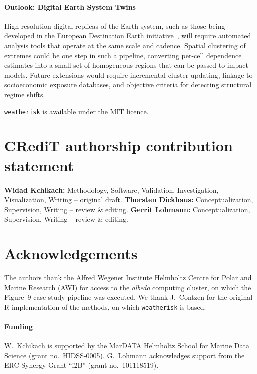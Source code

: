 \documentclass[preprint,12pt,a4paper]{elsarticle}
\newcommand{\revg}[1]{{#1}}
\begin{document}
\revg{\paragraph{Outlook: Digital Earth System Twins}
High-resolution digital replicas of the Earth system, such as those
being developed in the European Destination Earth
initiative~\cite{bauer2021}, will require automated analysis tools
that operate at the same scale and cadence.
Spatial clustering of extremes could be one step in such a pipeline,
converting per-cell dependence estimates into a small set of
homogeneous regions that can be passed to impact models.
Future extensions would require incremental cluster updating, linkage
to socioeconomic exposure databases, and objective criteria for
detecting structural regime shifts.}

\revg{\texttt{weatherisk} is available under the MIT licence.}

\section*{CRediT authorship contribution statement}
\textbf{Widad Kchikach:} Methodology, Software, Validation,
Investigation, Visualization, Writing -- original draft.
\textbf{Thorsten Dickhaus:} Conceptualization, Supervision,
Writing -- review \& editing.
\textbf{Gerrit Lohmann:} Conceptualization, Supervision,
Writing -- review \& editing.

\section*{Acknowledgements}
The authors thank the Alfred Wegener Institute Helmholtz Centre for
Polar and Marine Research (AWI) for access to the \emph{albedo}
computing cluster, on which the Figure~9 case-study pipeline was
executed. We thank J.~Contzen for the original R implementation of
the methods, on which \texttt{weatherisk} is based.

\paragraph*{Funding}
W.~Kchikach is supported by the MarDATA Helmholtz School for Marine
Data Science (grant no.\ HIDSS-0005). G.~Lohmann acknowledges
support from the ERC Synergy Grant ``i2B'' (grant no.\ 101118519).
\end{document}
